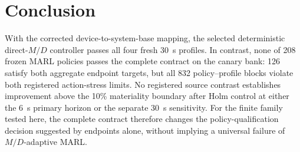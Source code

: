 \documentclass[conference,a4paper]{IEEEtran}
\begin{document}
\section{Conclusion}
\label{sec:conclusion}

With the corrected device-to-system-base mapping, the selected deterministic
direct-$M/D$ controller passes all four fresh \SI{30}{s} profiles. In contrast,
none of 208 frozen MARL policies passes the complete contract on the canary bank:
126 satisfy both aggregate endpoint targets, but all 832 policy--profile
blocks violate both registered action-stress limits. No registered source
contrast establishes improvement above the 10\% materiality boundary after
Holm control at either the \SI{6}{s} primary horizon or the separate
\SI{30}{s} sensitivity. For the finite family tested here, the complete contract
therefore changes the policy-qualification decision suggested by endpoints
alone, without implying a universal failure of $M/D$-adaptive MARL.



\end{document}
